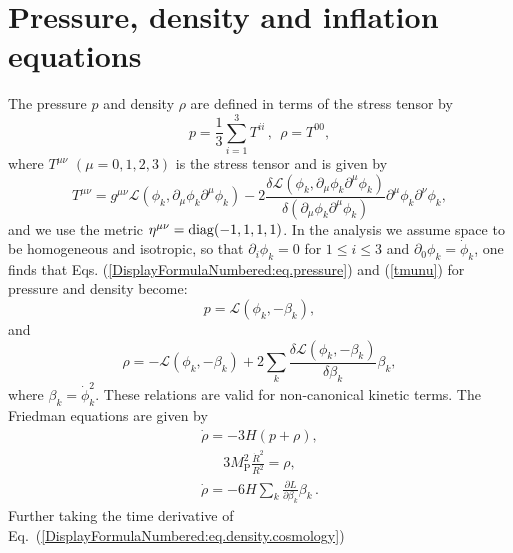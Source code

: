 \documentclass[a4paper,11pt]{article}
\begin{document}
\section{Pressure, density and inflation equations \label{sec4}}
  The pressure $p$ and density $\rho$ are defined in terms of the stress tensor by
  \begin{equation}\label{DisplayFormulaNumbered:eq.pressure}
    p= \frac{1}{3} \sum_{i=1}^3 T^{ii}\,,
    ~~\rho =T^{00},
  \end{equation}
  where $T^{\mu\nu}$ $(\mu=0, 1, 2, 3)$ is the stress tensor and is given by
  \begin{equation}
    T^{\mu \nu}=g^{\mu \nu} \mathcal{L}\left(\phi_k,\partial_\mu \phi_k \partial^\mu \phi_k \right)-2\frac{\delta \mathcal{L}\left(\phi_k,\partial_\mu \phi_k \partial^\mu \phi_k \right)}{\delta \left(\partial_\mu \phi_k \partial^\mu \phi_k \right)}\partial^\mu \phi_k \partial^\nu \phi_k,
    \label{tmunu}
  \end{equation}
  and we use the metric $\eta^{\mu\nu}= {\rm diag}(-1, 1, 1, 1)$.
  In the analysis we assume space to be homogeneous and isotropic, so that $\partial_i\phi_k = 0$ for $1 \leq i \leq 3$ and 
	$\partial_0 \phi_{k} = \dot{\phi}_k$,
  one finds that Eqs. (\ref{DisplayFormulaNumbered:eq.pressure}) and (\ref{tmunu})
  for pressure and density become:
  \begin{equation}\label{DisplayFormulaNumbered:eq.pressure.cosmology}
    p = \mathcal{L}\left(\phi_k, - \beta_k \right),
  \end{equation}
  and
  \begin{equation}\label{DisplayFormulaNumbered:eq.density.cosmology}
    \rho = -\mathcal{L}\left(\phi_k, - \beta_k\right) + 2\sum_{k}\frac{\delta \mathcal{L}\left(\phi_k, - \beta_k \right)}{\delta \beta_k}
    \beta_k,
  \end{equation}
  where $\beta_k = \dot \phi_k^2$.
  These relations are valid for non-canonical kinetic terms.
  The Friedman equations are given by
  \begin{align}
    \dot \rho = -3H (p + \rho),
    \label{fried1}
  \end{align}
  \begin{align}
    3 M_\text{P}^2 \frac{\dot R^2}{R^2} = \rho,
    \label{fried2}
  \end{align}
  \begin{align}
    \dot\rho= - 6H \sum_{k} \frac{\partial L}{\partial \beta_k} \beta_k\,.
    \label{rhodot1}
  \end{align}
  Further taking the time derivative of Eq.~(\ref{DisplayFormulaNumbered:eq.density.cosmology})
\end{document}
